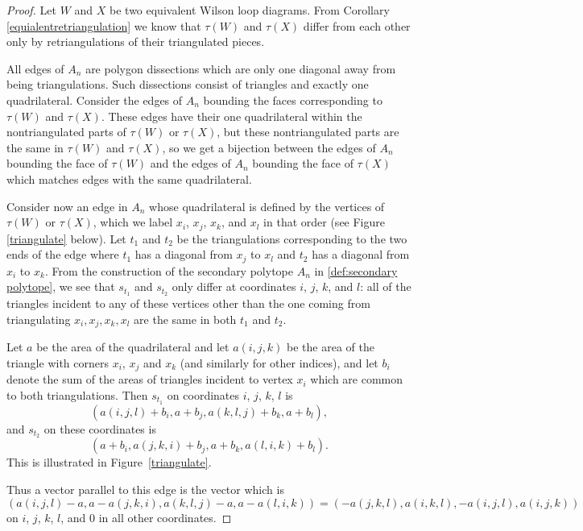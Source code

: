\documentclass[11pt]{article}
\theoremstyle{remark}
\theoremstyle{definition}
\begin{document}
\begin{proof}
  Let $W$ and $X$ be two equivalent Wilson loop diagrams.  From Corollary \ref{equialentretriangulation} we know that $\tau(W)$ and $\tau(X)$ differ from each other only by retriangulations of their triangulated pieces. 

All edges of $A_n$ are polygon dissections which are only one diagonal away from being triangulations.  Such dissections consist of triangles and exactly one quadrilateral.  Consider the edges of $A_n$ bounding the faces corresponding to $\tau(W)$ and $\tau(X)$.  These edges have their one quadrilateral within the nontriangulated parts of $\tau(W)$ or $\tau(X)$, but these nontriangulated parts are the same in $\tau(W)$ and $\tau(X)$, so we get a bijection between the edges of $A_n$ bounding the face of $\tau(W)$ and the edges of $A_n$ bounding the face of $\tau(X)$ which matches edges with the same quadrilateral.

Consider now an edge in $A_n$ whose quadrilateral is defined by the vertices of $\tau(W)$ or $\tau(X)$, which we label $x_i$, $x_j$, $x_k$, and $x_l$ in that order (see Figure \ref{triangulate} below).  Let $t_1$ and $t_2$ be the triangulations corresponding to the two ends of the edge where $t_1$ has a diagonal from $x_j$ to $x_l$ and $t_2$ has a diagonal from $x_i$ to $x_k$.  From the construction of the secondary polytope $A_n$ in \ref{def:secondary polytope}, we see that $s_{t_1}$ and $s_{t_2}$ only differ at coordinates $i$, $j$, $k$, and $l$: all of the triangles incident to any of these vertices other than the one coming from triangulating $x_i, x_j, x_k, x_l$ are the same in both $t_1$ and $t_2$.  

Let $a$ be the area of the quadrilateral and let $a(i,j,k)$ be the area of the triangle with corners $x_i$, $x_j$ and $x_k$ (and similarly for other indices), and let $b_i$ denote the sum of the areas of triangles incident to vertex $x_i$ which are common to both triangulations. Then $s_{t_1}$ on coordinates $i$, $j$, $k$, $l$ is 
\[(a(i,j,l) + b_i, a+b_j, a(k,l,j)+b_k, a+b_l),\]
and $s_{t_2}$ on these coordinates is 
\[(a + b_i, a(j,k,i)+b_j, a+b_k, a(l,i,k)+b_l).\] 
This is illustrated in Figure~\ref{triangulate}.

Thus a vector parallel to this edge is the vector which is 
\begin{equation}\label{eq:direction vector for quadrilateral}(a(i,j,l) - a, a-a(j,k,i), a(k,l,j)-a, a-a(l,i,k)) = (-a(j,k,l), a(i,k,l), -a(i,j,l), a(i,j,k))\end{equation}
on $i$, $j$, $k$, $l$, and $0$ in all other coordinates. 


\end{proof}
\end{document}

